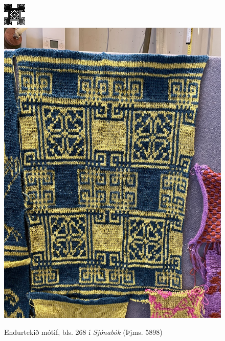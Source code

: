 \documentclass[a4paper,10pt,twocolumn]{article}
\begin{document}
\begin{figure}
    \centering
    \includegraphics[width=0.45\linewidth]{figs/thjms5898_268.png}
    \hfill
    \includegraphics[width=0.45\linewidth]{figs/repeat.jpg}
    \caption{Endurtekið mótif, bls. 268 í \textit{Sjónabók} (Þjms. 5898)}
    \label{fig:repeat}
\end{figure}
\end{document}
